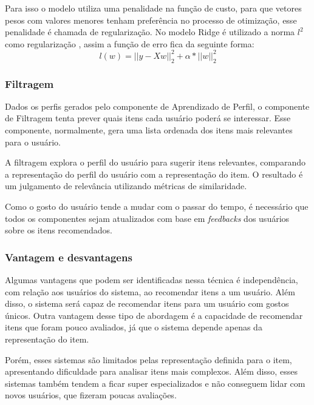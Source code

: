 \begin{itemize}
    Para isso o modelo utiliza uma penalidade na função de custo, para que vetores pesos com valores menores tenham preferência no processo de otimização\cite{Goodfellow-et-al-2016}, esse penalidade é chamada de regularização. No modelo Ridge é utilizado a norma \(l^2\) como regularização \cite{scikit-learn}, assim a função de erro fica da seguinte forma:
    \begin{equation}
        l(w) = ||y - Xw||^2_2 + \alpha * ||w||^2_2
    \end{equation}
\end{itemize}

\subsubsection{Filtragem}
Dados os perfis gerados pelo componente de Aprendizado de Perfil, o componente de Filtragem tenta prever quais itens cada usuário poderá se interessar. Esse componente, normalmente, gera uma lista ordenada dos itens mais relevantes para o usuário\cite{lops2011content}. 

A filtragem explora o perfil do usuário para sugerir itens relevantes, comparando a representação do perfil do usuário com a representação do item. O resultado é um julgamento de relevância utilizando métricas de similaridade.


Como o gosto do usuário tende a mudar com o passar do tempo, é necessário que todos os componentes sejam atualizados com base em \textit{feedbacks} dos usuários sobre os itens recomendados.
 
\subsubsection{Vantagem e desvantagens}

Algumas vantagens que podem ser identificadas nessa técnica é independência, com relação aos usuários do sistema, ao recomendar itens a um usuário. Além disso, o sistema será capaz de recomendar itens para um usuário com gostos únicos\cite{jain2015trends}. Outra vantagem desse tipo de abordagem é a capacidade de recomendar itens que foram pouco avaliados, já que o sistema depende apenas da representação do item.

Porém, esses sistemas são limitados pelas representação definida para o item, apresentando dificuldade para analisar itens mais complexos. Além disso, esses sistemas também tendem a ficar super especializados e não conseguem lidar com novos usuários, que fizeram poucas avaliações\cite{lops2011content}.

